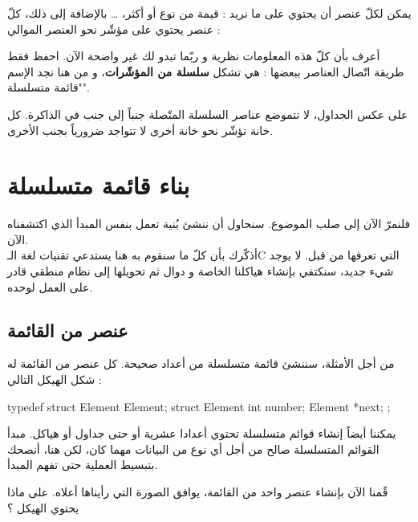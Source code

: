 
يمكن لكلّ عنصر أن يحتوي على ما نريد : قيمة من نوع 
أو أكثر،
 \dots
بالإضافة إلى ذلك، كلّ عنصر يحتوي على مؤشّر نحو العنصر الموالي :


أعرف بأن كلّ هذه المعلومات نظرية و ربّما تبدو لك غير واضحة الآن. احفظ فقط طريقة اتّصال العناصر ببعضها : هي تشكل 
\textbf{سلسلة من المؤشّرات}،
و من هنا نجد الإسم "قائمة متسلسلة". 

\begin{information}
على عكس الجداول، لا تتموضع عناصر السلسلة المتّصلة جنباً إلى جنب في الذاكرة. كل خانة تؤشّر نحو خانة أخرى لا تتواجد ضرورياً بجنب الأخرى.
\end{information}

\section{بناء قائمة متسلسلة}

فلنمرّ الآن إلى صلب الموضوع. سنحاول أن ننشئ بُنية تعمل بنفس المبدأ الذي اكتشفناه الآن.\\
أذكّرك بأن كلّ ما سنقوم به هنا يستدعي تقنيات لغة الـ\textenglish{C}
 التي تعرفها من قبل. لا يوجد شيء جديد، سنكتفي بإنشاء هياكلنا الخاصة و دوال ثم تحويلها إلى نظام منطقي قادر على العمل لوحده.

\subsection{عنصر من القائمة}

من أجل الأمثلة، سننشئ قائمة متسلسلة من أعداد صحيحة. كل عنصر من القائمة له شكل الهيكل التالي :

\begin{Csource}
typedef struct Element Element;
struct Element
{
	int number;
	Element *next;
};
\end{Csource}

\begin{information}
يمكننا أيضاً إنشاء قوائم متسلسلة تحتوي أعدادا عشرية أو حتى جداول أو هياكل. مبدأ القوائم المتسلسلة صالح من أجل أي نوع من البيانات مهما كان، لكن هنا، أنصحك بتبسيط العملية حتى تفهم المبدأ.
\end{information}

قًمنا الآن بإنشاء عنصر واحد من القائمة، يوافق الصورة التي رأيناها أعلاه. على ماذا يحتوي الهيكل ؟

